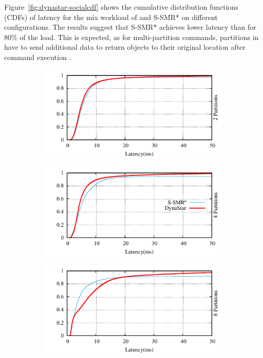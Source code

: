 Figure~\ref{fig:dynastar-socialcdf} shows the cumulative distribution functions (CDFs) of
latency for the mix workload of \dynastar and S-SMR* on different
configurations. The results suggest that S-SMR* achieves lower latency than
\dynastar for 80\% of the load. This is expected, as for multi-partition
commands, partitions in \dynastar have to send additional data to return objects
to their original location after command execution .

\begin{figure}[ht!]
  \centering
  \begin{subfigure}{0.48\columnwidth}
    \centering
    \includegraphics[width=\textwidth]{./figures/experiments/dynastar/chirper-latency-cdf-2p.pdf}
  \end{subfigure}
  \begin{subfigure}{0.48\columnwidth}
    \centering
    \includegraphics[width=\textwidth]{./figures/experiments/dynastar/chirper-latency-cdf-4p.pdf}
  \end{subfigure}
  \begin{subfigure}{0.48\columnwidth}
    \centering
    \includegraphics[width=\textwidth]{./figures/experiments/dynastar/chirper-latency-cdf-8p.pdf}

\end{subfigure}
\end{figure}
